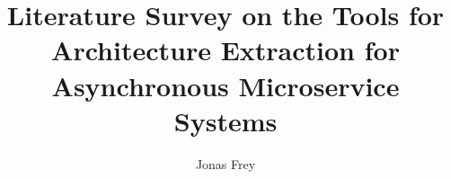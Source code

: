 \documentclass[twoside, english]{sdqseminar}
\author{Jonas Frey}
\title{Literature Survey on the Tools for Architecture Extraction for Asynchronous Microservice Systems}
\begin{document}
\setpdf

\maketitle

 

\begin{abstract}

\end{abstract}








\printbibliography[heading=bibintoc]
\end{document}
